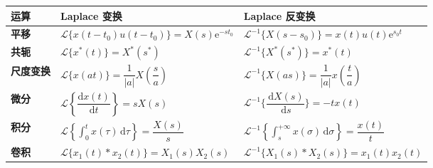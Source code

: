 \documentclass[UTF8,fontset=fandol,zihao=5]{ctexart}
\newcommand{\dd}{\,\mathrm{d}}
\begin{document}
\begin{table}[H]
  \centering
  \renewcommand{\arraystretch}{1.5}
  \begin{tabularx}{\textwidth}{
    @{}>{\bfseries}p{1.5cm}
    >{\centering\arraybackslash}X
    >{\centering\arraybackslash}X@{}
  }
    \toprule
    运算 & Laplace 变换 & Laplace 反变换 \\
    \midrule

    平移
    & $\mathcal{L}\{x(t-t_0)u(t-t_0)\}
        =X(s)\mathrm{e}^{-st_0}$
    & $\mathcal{L}^{-1}\{X(s-s_0)\}
        =x(t)u(t)\mathrm{e}^{s_0t}$ \\

    共轭
    & $\mathcal{L}\{x^*(t)\}=X^*(s^*)$
    & $\mathcal{L}^{-1}\{X^*(s^*)\}=x^*(t)$ \\

    尺度变换
    & $\mathcal{L}\{x(at)\}
        =\dfrac{1}{|a|}X\left(\dfrac{s}{a}\right)$
    & $\mathcal{L}^{-1}\{X(as)\}
        =\dfrac{1}{|a|}x\left(\dfrac{t}{a}\right)$ \\

    微分
    & $\mathcal{L}\left\{\dfrac{\mathrm{d}x(t)}{\mathrm{d}t}\right\}
        =sX(s)$
    & $\mathcal{L}^{-1}\{\dfrac{\dd X(s)}{\dd s}\}
        =-tx(t)$ \\

    积分
    & $\mathcal{L}\left\{\displaystyle\int_0^t
        x(\tau)\,\mathrm{d}\tau\right\}
        =\dfrac{X(s)}{s}$
    & $\mathcal{L}^{-1}\left\{\displaystyle\int_s^{+\infty}
        x(\sigma)\,\mathrm{d}\sigma\right\}
        =\dfrac{x(t)}{t}$ \\

    卷积
    & $\mathcal{L}\{x_1(t) \ast x_2(t)\}
        =X_1(s)X_2(s)$
    & $\mathcal{L}^{-1}\{X_1(s) \ast X_2(s)\}
        =x_1(t)x_2(t)$ \\

    \bottomrule
  \end{tabularx}
\end{table}


\begin{methodbox}[【技巧】Laplace反变换]
  
\end{methodbox}
\end{document}
